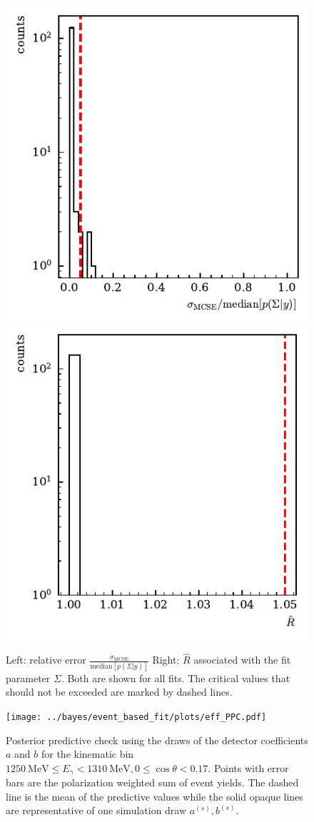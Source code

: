  \begin{figure}[htbp]
	\includegraphics[width=.49\linewidth]{../bayes/event_based_fit/plots/mcse_hist.pdf}
	\includegraphics[width=.49\linewidth]{../bayes/event_based_fit/plots/rhat_hist.pdf}
	\caption{ Left: relative error $\frac{\sigma_\text{MCSE}}{\text{median}\left[p\left(\Sigma|y\right)\right]}$ Right: $\widehat{R}$ associated with the fit parameter $\Sigma$. Both are shown for all fits. The critical values that should not be exceeded are marked by dashed lines.}
	\label{fig:diagnostics1}
\end{figure}
\begin{figure}[htbp]
	\centering
	\texttt{[image: ../bayes/event\_based\_fit/plots/eff\_PPC.pdf]}
	\caption{Posterior predictive check using the draws of the detector coefficients $a$ and $b$ for the kinematic bin $\SI{1250}{\mega\eV}\leq E_\gamma<\SI{1310}{\mega\eV}, 0\leq\cos\theta<0.17$. Points with error bars are the polarization weighted sum of event yields. The dashed line is the mean of the predictive values while the solid opaque lines are representative of one simulation draw $a^{(s)},b^{(s)}$.}
	\label{fig:eff_func}
\end{figure}
